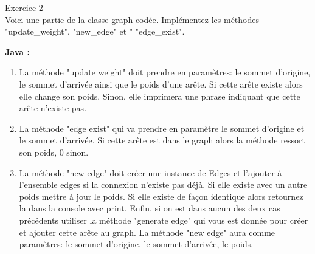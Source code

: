 \begin{Exercice}[20 minutes] Exercice 2\\

Voici une partie de la classe graph codée. Implémentez les méthodes "update\_weight", "new\_edge" et " "edge\_exist".

\textbf{Java :}
         
    \begin{enumerate}
        \item La méthode "update weight" doit prendre en paramètres: le sommet d'origine, le sommet d'arrivée ainsi que le poids d'une arête. Si cette arête existe alors elle change son poids. Sinon, elle imprimera une phrase indiquant que cette arête n'existe pas.
        \item La méthode "edge exist" qui va prendre en paramètre le sommet d'origine et le sommet d'arrivée. Si cette arête est dans le graph alors la méthode ressort son poids, 0 sinon.
        \item La méthode "new edge" doit créer une instance de Edges et l'ajouter à l'ensemble edges si la connexion n'existe pas déjà. Si elle existe avec un autre poids mettre à jour le poids. Si elle existe de façon identique alors retournez la dans la console avec print. Enfin, si on est dans aucun des deux cas précédents utiliser la méthode "generate edge" qui vous est donnée pour créer et ajouter cette arête au graph. La méthode "new edge" aura comme paramètres: le sommet d'origine, le sommet d'arrivée, le poids.
    \end{enumerate}


\end{Exercice}

